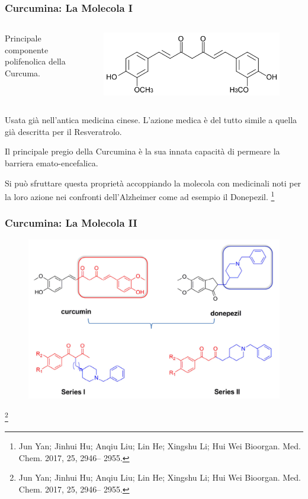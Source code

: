 \documentclass[9pt]{beamer}
\newcommand\blfootnote[1]{%
	\begingroup
	\renewcommand\thefootnote{}\footnote{#1}%
	\addtocounter{footnote}{-1}%
	\endgroup
}
\begin{document}
\begin{frame}
	\frametitle{Curcumina: La Molecola I}
	\begin{columns}
		\begin{column}{.4\textwidth}
			Principale componente polifenolica della Curcuma.
		\end{column}
		\begin{column}{.6\textwidth}
			\begin{figure}
				\includegraphics[width=.8\textwidth]{immagini/curcumina.png}
			\end{figure}
		\end{column}
	\end{columns}
	\bigskip
	
	Usata già nell'antica medicina cinese. L'azione medica è del tutto simile a quella già descritta per il Resveratrolo.
	
	Il principale pregio della Curcumina è la sua innata capacità di permeare la barriera emato-encefalica.
	
	Si può sfruttare questa proprietà accoppiando la molecola con medicinali noti per la loro azione nei confronti dell'Alzheimer come ad esempio il Donepezil.
	\blfootnote{Jun Yan; Jinhui Hu; Anqiu Liu; Lin He; Xingshu Li; Hui Wei Bioorgan. Med. Chem. 2017, 25, 2946–
		2955.}
\end{frame}

\begin{frame}
	\frametitle{Curcumina: La Molecola II}
	\begin{figure}
		\includegraphics[scale=0.9]{immagini/generale_curcdone.png}
	\end{figure}
	\blfootnote{Jun Yan; Jinhui Hu; Anqiu Liu; Lin He; Xingshu Li; Hui Wei Bioorgan. Med. Chem. 2017, 25, 2946–
		2955.}
\end{frame}
\end{document}
